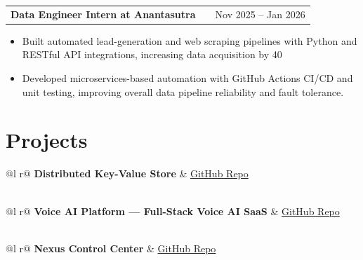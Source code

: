\documentclass[a4paper,10pt]{article}
\makeatletter
\newenvironment{joblong}[2]
    {
    \begin{tabularx}{\linewidth}{@{}l X r@{}}
    \textbf{#1} & \hfill &  #2 \\[3.50pt]
    \end{tabularx}
    \begin{minipage}[t]{\linewidth}
    \begin{itemize}[nosep,after=\strut, leftmargin=1em, itemsep=3pt,label=--]
    }
    {
    \end{itemize}
    \end{minipage}
    }
\makeatother
\begin{document}
\begin{joblong}{Data Engineer Intern at Anantasutra}{Nov 2025 -- Jan 2026}
\item Built automated lead-generation and web scraping pipelines with Python and RESTful API integrations, increasing data acquisition by 40%
\item Developed microservices-based automation with GitHub Actions CI/CD and unit testing, improving overall data pipeline reliability and fault tolerance.
\end{joblong}

\section{Projects}

\begin{tabularx}{\linewidth}{ @{}l r@{} }
\textbf{Distributed Key-Value Store} & \hfill \href{https://github.com/Abhiboss07/Distributed-KV-Store}{GitHub Repo} \\[2pt]
 \\
\end{tabularx}

\begin{tabularx}{\linewidth}{ @{}l r@{} }
\textbf{Voice AI Platform — Full-Stack Voice AI SaaS} & \hfill \href{https://github.com/Abhiboss07/Voice-Agent}{GitHub Repo} \\[2pt]
  \\
\end{tabularx}

\begin{tabularx}{\linewidth}{ @{}l r@{} }
\textbf{Nexus Control Center} & \hfill \href{https://github.com/Abhiboss07/Nexus}{GitHub Repo} \\[2pt]
  \\
\end{tabularx}
\end{document}
